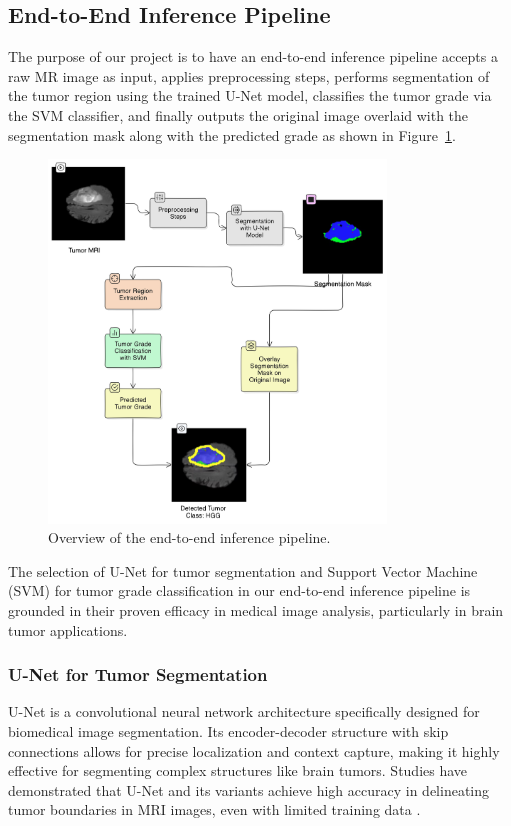\subsection{End-to-End Inference Pipeline}
The purpose of our project is to have an end-to-end inference pipeline accepts a raw MR image as input, applies preprocessing steps, performs segmentation of the tumor region using the trained U-Net model, classifies the tumor grade via the SVM classifier, and finally outputs the original image overlaid with the segmentation mask along with the predicted grade as shown in Figure~\ref{fig:pipeline}.
\begin{figure}[H]
  \centering
  \includegraphics[width=0.8\textwidth]{Images/Chapter3/pipeline.png}
  \caption{Overview of the end-to-end inference pipeline.}
  \label{fig:pipeline}
\end{figure}
The selection of U-Net for tumor segmentation and Support Vector Machine (SVM) for tumor grade classification in our end-to-end inference pipeline is grounded in their proven efficacy in medical image analysis, particularly in brain tumor applications.

\subsubsection{U-Net for Tumor Segmentation}
U-Net is a convolutional neural network architecture specifically designed for biomedical image segmentation. Its encoder-decoder structure with skip connections allows for precise localization and context capture, making it highly effective for segmenting complex structures like brain tumors. Studies have demonstrated that U-Net and its variants achieve high accuracy in delineating tumor boundaries in MRI images, even with limited training data \cite{dong2017automatic, walsh2022using}.

